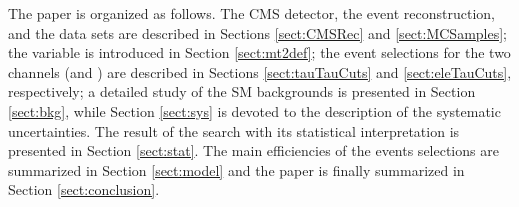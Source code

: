 The paper is organized as follows.  The CMS detector, the event reconstruction, and the data sets are described
in Sections \ref{sect:CMSRec} and \ref{sect:MCSamples}; the \mttwo variable is introduced in Section \ref{sect:mt2def}; 
the event selections for the two channels (\tauTau and \leptonTau)
are described in Sections \ref{sect:tauTauCuts} and \ref{sect:eleTauCuts}, respectively;
a detailed study of the SM backgrounds is presented in Section \ref{sect:bkg}, while Section \ref{sect:sys} 
is devoted to the description of the systematic uncertainties.  The result of the search with its statistical interpretation is presented in 
Section \ref{sect:stat}. The main efficiencies of the events selections are summarized in Section \ref{sect:model} and the paper is finally summarized in Section \ref{sect:conclusion}.





